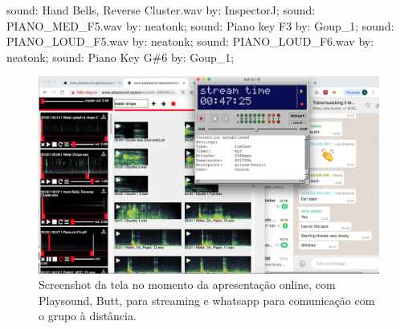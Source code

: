 sound: Hand Bells, Reverse Cluster.wav by: InspectorJ; sound: PIANO\_MED\_F5.wav by: neatonk; sound: Piano key F3 by: Goup\_1; sound: PIANO\_LOUD\_F5.wav by: neatonk; sound: PIANO\_LOUD\_F6.wav by: neatonk; sound: Piano Key G\#6 by: Goup\_1;

\begin{figure}


\includegraphics[width=0.7\linewidth]{pictures/cap4/telasarc}
\caption{Screenshot da tela no momento da apresentação online, com Playsound, Butt, para streaming e whatsapp para comunicação com o grupo à distância.}
\label{telasarc}
\end{figure}















